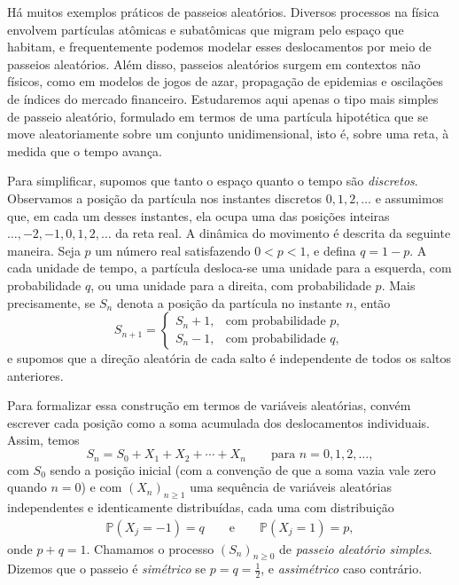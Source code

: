 \documentclass[12pt,portuguese]{article}
\theoremstyle{definition}
\theoremstyle{plainexercise}
\theoremstyle{starredexercise}
\theoremstyle{definition}
\begin{document}
Há muitos exemplos práticos de passeios aleatórios. Diversos processos na
física envolvem partículas atômicas e subatômicas que migram pelo espaço que
habitam, e frequentemente podemos modelar esses deslocamentos por meio de
passeios aleatórios. Além disso, passeios aleatórios surgem em contextos não
físicos, como em modelos de jogos de azar, propagação de epidemias e
oscilações de índices do mercado financeiro. Estudaremos aqui apenas o tipo
mais simples de passeio aleatório, formulado em termos de uma partícula
hipotética que se move aleatoriamente sobre um conjunto unidimensional, isto
é, sobre uma reta, à medida que o tempo avança.

Para simplificar, supomos que tanto o espaço quanto o tempo são
\emph{discretos}. Observamos a posição da partícula nos instantes discretos
$0, 1, 2, \ldots$ e assumimos que, em cada um desses instantes, ela ocupa uma
das posições inteiras $\ldots, -2, -1, 0, 1, 2, \ldots$ da reta real. A
dinâmica do movimento é descrita da seguinte maneira. Seja $p$ um número real
satisfazendo $0 < p < 1$, e defina $q = 1 - p$. A cada unidade de tempo, a
partícula desloca-se uma unidade para a esquerda, com probabilidade $q$, ou
uma unidade para a direita, com probabilidade $p$. Mais precisamente, se $S_n$
denota a posição da partícula no instante $n$, então
\[
  S_{n+1} =
  \begin{cases}
    S_n + 1, & \text{com probabilidade } p, \\
    S_n - 1, & \text{com probabilidade } q,
  \end{cases}
\]
e supomos que a direção aleatória de cada salto é independente de todos os
saltos anteriores.

Para formalizar essa construção em termos de variáveis aleatórias, convém
escrever cada posição como a soma acumulada dos deslocamentos individuais.
Assim, temos
\begin{equation}\label{eq:passeio-soma}
  S_n = S_0 + X_1 + X_2 + \cdots + X_n \qquad \text{para } n = 0, 1, 2, \ldots,
\end{equation}
com $S_0$ sendo a posição inicial (com a convenção de que a soma vazia vale
zero quando $n = 0$) e com $(X_n)_{n \geqslant 1}$ uma sequência de variáveis
aleatórias independentes e identicamente distribuídas, cada uma com
distribuição
\begin{align*}
\mathbb{P}(X_j=-1)= q \qquad \text{e}\qquad \mathbb{P}(X_j=1)=p,
\end{align*}
onde $p+q=1$. Chamamos o processo $(S_n)_{n \geqslant 0}$ de \emph{passeio aleatório simples}. Dizemos
que o passeio é \emph{simétrico} se $p = q = \tfrac{1}{2}$, e
\emph{assimétrico} caso contrário.
\end{document}
